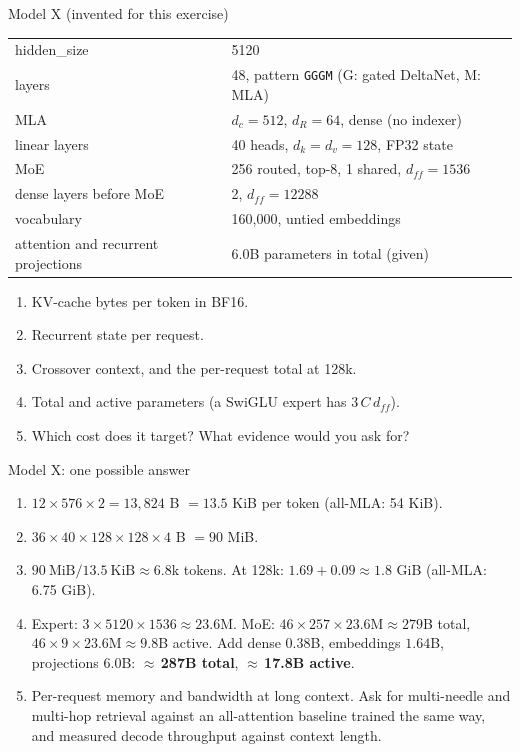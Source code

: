 \documentclass[handout]{beamer}
\begin{document}
\begin{frame}{Model X (invented for this exercise)}
  \footnotesize
  \begin{tabular}{@{}ll@{}}
    \toprule
    hidden\_size & 5120 \\
    layers & 48, pattern \texttt{GGGM} (G: gated DeltaNet, M: MLA) \\
    MLA & $d_c=512$, $d_R=64$, dense (no indexer) \\
    linear layers & 40 heads, $d_k=d_v=128$, FP32 state \\
    MoE & 256 routed, top-8, 1 shared, $d_{ff}=1536$ \\
    dense layers before MoE & 2, $d_{ff}=12288$ \\
    vocabulary & 160,000, untied embeddings \\
    attention and recurrent projections & 6.0B parameters in total (given) \\
    \bottomrule
  \end{tabular}
  \par\vspace{6pt}
  \small
  \begin{enumerate}
      \setlength{\itemsep}{2pt}
    \item KV-cache bytes per token in BF16.
    \item Recurrent state per request.
    \item Crossover context, and the per-request total at 128k.
    \item Total and active parameters (a SwiGLU expert has $3\,C\,d_{ff}$).
    \item Which cost does it target? What evidence would you ask for?
  \end{enumerate}
\end{frame}

\begin{frame}{Model X: one possible answer}
  \small
  \begin{enumerate}
      \setlength{\itemsep}{4pt}
    \item $12\times576\times2=13{,}824$ B $=13.5$ KiB per token (all-MLA: 54 KiB).
    \item $36\times40\times128\times128\times4$ B $=90$ MiB.
    \item $90\ \text{MiB}/13.5\ \text{KiB}\approx6.8$k tokens. At 128k: $1.69+0.09\approx1.8$ GiB (all-MLA: 6.75 GiB).
    \item Expert: $3\times5120\times1536\approx23.6$M. MoE: $46\times257\times23.6\text{M}\approx279$B total, $46\times9\times23.6\text{M}\approx9.8$B active. Add dense $0.38$B, embeddings $1.64$B, projections $6.0$B: $\approx$\,\textbf{287B total}, $\approx$\,\textbf{17.8B active}.
    \item Per-request memory and bandwidth at long context. Ask for multi-needle and multi-hop retrieval against an all-attention baseline trained the same way, and measured decode throughput against context length.
  \end{enumerate}
\end{frame}
\end{document}
